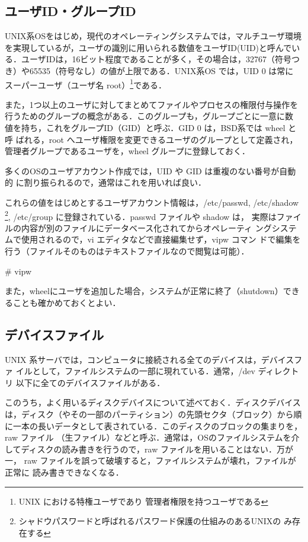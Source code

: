 \subsection{ユーザID・グループID}
UNIX系OSをはじめ，現代のオペレーティングシステムでは，マルチユーザ環境
を実現しているが，ユーザの識別に用いられる数値をユーザID(UID)と呼んでい
る．ユーザIDは，16ビット程度であることが多く，その場合は，32767（符号つ
  き）や65535（符号なし）の値が上限である．UNIX系OS では，UID 0 は常に
スーパーユーザ（ユーザ名 root）\footnote{UNIX における特権ユーザであり
  管理者権限を持つユーザである}である．

また，1つ以上のユーザに対してまとめてファイルやプロセスの権限付与操作を
行うためのグループの概念がある．このグループも，グループごとに一意に数
値を持ち，これをグループID（GID）と呼ぶ．GID 0 は，BSD系では wheel と呼
ばれる，root へユーザ権限を変更できるユーザのグループとして定義され，
管理者グループであるユーザを，wheel グループに登録しておく．

多くのOSのユーザアカウント作成では，UID や GID は重複のない番号が自動的
に割り振られるので，通常はこれを用いれば良い．

これらの値をはじめとするユーザアカウント情報は，/etc/passwd, /etc/shadow
\footnote{シャドウパスワードと呼ばれるパスワード保護の仕組みのあるUNIXの
み存在する}, /etc/group に登録されている．passwd ファイルや shadow は，
実際はファイルの内容が別のファイルにデータベース化されてからオペレーティ
ングシステムで使用されるので，vi エディタなどで直接編集せず，vipw コマン
ドで編集を行う（ファイルそのものはテキストファイルなので閲覧は可能）．

\begin{cli}
# vipw
\end{cli}

また，wheelにユーザを追加した場合，システムが正常に終了（shutdown）できることも確かめておくとよい．
\subsection{デバイスファイル}

UNIX 系サーバでは，コンピュータに接続される全てのデバイスは，デバイスファ
イルとして，ファイルシステムの一部に現れている．通常，/dev ディレクトリ
以下に全てのデバイスファイルがある．

このうち，よく用いるディスクデバイスについて述べておく．ディスクデバイス
は，ディスク（やその一部のパーティション）の先頭セクタ（ブロック）から順
に一本の長いデータとして表されている．このディスクのブロックの集まりを，
raw ファイル （生ファイル）などと呼ぶ．通常は，OSのファイルシステムを介
してディスクの読み書きを行うので，raw ファイルを用いることはない．万が一，
raw ファイルを誤って破壊すると，ファイルシステムが壊れ，ファイルが正常に
読み書きできなくなる．


